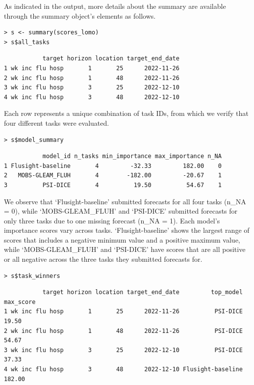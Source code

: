 \documentclass[
  article,
  shortnames,
  notitle]{jss}
\begin{document}
\normalsize

As indicated in the output, more details about the summary are available
through the summary object's elements as follows.

\begin{verbatim}
> s <- summary(scores_lomo)
> s$all_tasks
\end{verbatim}

\small

\begin{verbatim}
           target horizon location target_end_date
1 wk inc flu hosp       1       25      2022-11-26
2 wk inc flu hosp       1       48      2022-11-26
3 wk inc flu hosp       3       25      2022-12-10
4 wk inc flu hosp       3       48      2022-12-10
\end{verbatim}

\normalsize

Each row represents a unique combination of task IDs, from which we
verify that four different tasks were evaluated.

\begin{verbatim}
> s$model_summary
\end{verbatim}

\small

\begin{verbatim}
           model_id n_tasks min_importance max_importance n_NA
1 Flusight-baseline       4         -32.33         182.00    0
2   MOBS-GLEAM_FLUH       4        -182.00         -20.67    1
3          PSI-DICE       4          19.50          54.67    1
\end{verbatim}

\normalsize

We observe that `Flusight-baseline' submitted forecasts for all four
tasks (n\_NA = 0), while `MOBS-GLEAM\_FLUH' and `PSI-DICE' submitted
forecasts for only three tasks due to one missing forecast (n\_NA = 1).
Each model's importance scores vary across tasks. `Flusight-baseline'
shows the largest range of scores that includes a negative minimum value
and a positive maximum value, while `MOBS-GLEAM\_FLUH' and `PSI-DICE'
have scores that are all positive or all negative across the three tasks
they submitted forecasts for.

\begin{verbatim}
> s$task_winners
\end{verbatim}

\small

\begin{verbatim}
           target horizon location target_end_date         top_model max_score
1 wk inc flu hosp       1       25      2022-11-26          PSI-DICE     19.50
2 wk inc flu hosp       1       48      2022-11-26          PSI-DICE     54.67
3 wk inc flu hosp       3       25      2022-12-10          PSI-DICE     37.33
4 wk inc flu hosp       3       48      2022-12-10 Flusight-baseline    182.00
\end{verbatim}
\end{document}

